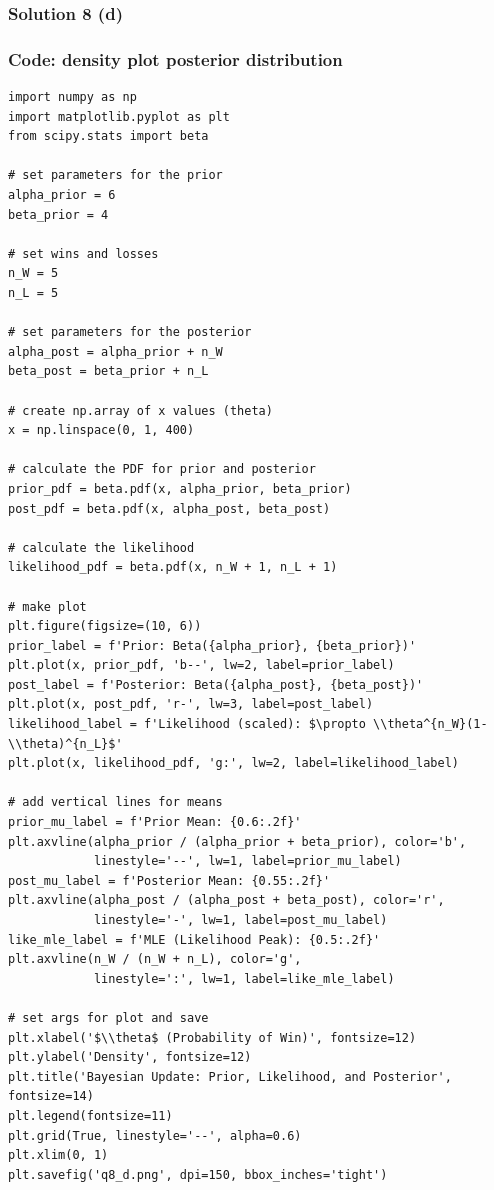 \documentclass{article}
\begin{document}
\subsubsection*{Solution 8 (d)}
\subsubsection*{Code: density plot posterior distribution}
\begin{lstlisting}
import numpy as np
import matplotlib.pyplot as plt
from scipy.stats import beta

# set parameters for the prior
alpha_prior = 6
beta_prior = 4

# set wins and losses
n_W = 5
n_L = 5

# set parameters for the posterior
alpha_post = alpha_prior + n_W  
beta_post = beta_prior + n_L  

# create np.array of x values (theta)
x = np.linspace(0, 1, 400)

# calculate the PDF for prior and posterior
prior_pdf = beta.pdf(x, alpha_prior, beta_prior)
post_pdf = beta.pdf(x, alpha_post, beta_post)

# calculate the likelihood 
likelihood_pdf = beta.pdf(x, n_W + 1, n_L + 1)

# make plot
plt.figure(figsize=(10, 6))
prior_label = f'Prior: Beta({alpha_prior}, {beta_prior})'
plt.plot(x, prior_pdf, 'b--', lw=2, label=prior_label)
post_label = f'Posterior: Beta({alpha_post}, {beta_post})'
plt.plot(x, post_pdf, 'r-', lw=3, label=post_label)
likelihood_label = f'Likelihood (scaled): $\propto \\theta^{n_W}(1-\\theta)^{n_L}$'
plt.plot(x, likelihood_pdf, 'g:', lw=2, label=likelihood_label)

# add vertical lines for means
prior_mu_label = f'Prior Mean: {0.6:.2f}'
plt.axvline(alpha_prior / (alpha_prior + beta_prior), color='b', 
            linestyle='--', lw=1, label=prior_mu_label)
post_mu_label = f'Posterior Mean: {0.55:.2f}'
plt.axvline(alpha_post / (alpha_post + beta_post), color='r', 
            linestyle='-', lw=1, label=post_mu_label)
like_mle_label = f'MLE (Likelihood Peak): {0.5:.2f}'
plt.axvline(n_W / (n_W + n_L), color='g', 
            linestyle=':', lw=1, label=like_mle_label)

# set args for plot and save
plt.xlabel('$\\theta$ (Probability of Win)', fontsize=12)
plt.ylabel('Density', fontsize=12)
plt.title('Bayesian Update: Prior, Likelihood, and Posterior', fontsize=14)
plt.legend(fontsize=11)
plt.grid(True, linestyle='--', alpha=0.6)
plt.xlim(0, 1)
plt.savefig('q8_d.png', dpi=150, bbox_inches='tight')
\end{lstlisting}
\end{document}

